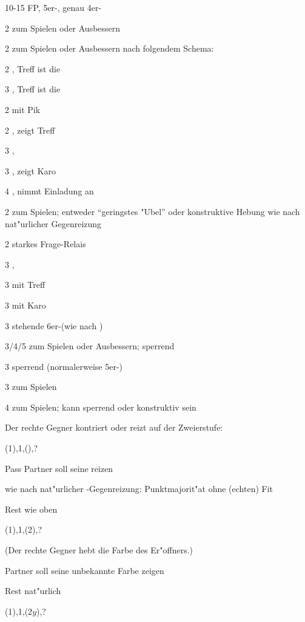 \begin{appendix}
		10-15 FP, 5\pl{}er-\ufa, genau 4er-\pi
		\bdsc
			\item[2\tre] zum Spielen oder Ausbessern
			\item[2\kar] zum Spielen oder Ausbessern nach folgendem
Schema:
				\bdsc
					\item[2\SA] \maxi, Treff ist die \ufa
					\item[3\tre] \mini, Treff ist die \ufa
				\edsc
			\item[2\coe] \inv{}\pl mit Pik
				\bdsc
					\item[2\SA] \maxi, zeigt Treff
					\item[3\uf] \mini, \nat
					\item[3\coe] \maxi, zeigt Karo
					\item[4\pik] \maxi, nimmt Einladung an
				\edsc
			\item[2\pik] zum Spielen; entweder "`geringstes "Ubel"'
oder konstruktive Hebung wie nach nat"urlicher Gegenreizung
			\item[2\NT] starkes Frage-Relais
				\bdsc
					\item[3\uf] \mini, \nat
					\item[3\coe] \maxi mit Treff
					\item[3\pik] \maxi mit Karo
					\item[3\SA] stehende 6er-\ufa (wie nach
)
				\edsc
			\item[3\uf/4\uf/5\tre] zum Spielen oder Ausbessern;
sperrend
			\item[3\pik] sperrend (normalerweise 5er-\pi)
			\item[3\SA] zum Spielen
			\item[4\pik] zum Spielen; kann sperrend oder konstruktiv
sein
		\edsc
\edsc

Der rechte Gegner kontriert oder reizt auf der Zweierstufe:
\bdsc
	\item[(1\anybid{})\sep{}1\SA{}\sep{}(\kontra{})\sep{}?]~
		\bdsc
			\item[Pass] Partner soll seine \ufa reizen
			\item[\rekontra] wie nach nat"urlicher
\ofa-Gegenreizung: Punktmajorit"at ohne (echten) Fit
			\item[Rest] wie oben
		\edsc
	\item[(1\anybid{})\sep{}1\SA{}\sep{}(2\anybid{})\sep{}?]~
	
		(Der rechte Gegner hebt die Farbe des Er"offners.)
		\bdsc
			\item[\kontra] Partner soll seine unbekannte Farbe
zeigen
			\item[Rest] nat"urlich
		\edsc
	\item[(1\anybid{})\sep{}1\SA{}\sep{}(2\hspace{\cardskip}$y$)\sep{}?]~
	

\end{appendix}
